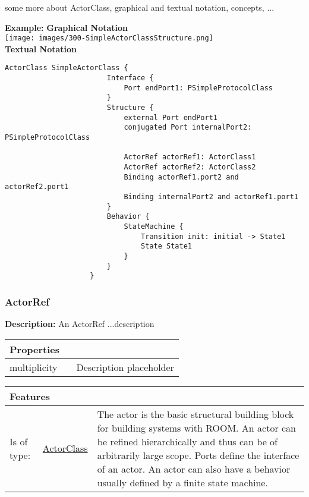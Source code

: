 			some more about ActorClass, graphical and textual notation, concepts, ...
			
			\textbf{Example:} 
				\textbf{Graphical Notation}
				\\
					\texttt{[image: images/300-SimpleActorClassStructure.png]}
				\\
				\textbf{Textual Notation}
				\\
					\begin{lstlisting}[language=ROOM]
					ActorClass SimpleActorClass {
						Interface {
							Port endPort1: PSimpleProtocolClass
						}
						Structure {
							external Port endPort1
							conjugated Port internalPort2: PSimpleProtocolClass
				
							ActorRef actorRef1: ActorClass1
							ActorRef actorRef2: ActorClass2
							Binding actorRef1.port2 and actorRef2.port1
							Binding internalPort2 and actorRef1.port1
						}
						Behavior {
							StateMachine {
								Transition init: initial -> State1
								State State1
							}
						}
					}
					\end{lstlisting}
		
		\vspace{\baselineskip}
		\vspace{\baselineskip}
		\vspace{\baselineskip}
		
		\subsubsection{\huge ActorRef}
			\hypertarget{ref:ActorRef}{}
			
			\textbf{Description:} An ActorRef ...description
			
			\begingroup
			\renewcommand{\arraystretch}{1.8} %
			\begin{longtable}{p{2.5cm}p{4cm} p{}}
				\multicolumn{2}{l}{\textbf{\large Properties}} \\
				\hline
			\tabitem multiplicity &  & Description placeholder\\
			\end{longtable}
			\endgroup
			
			\begingroup
			\renewcommand{\arraystretch}{1.8} %
			\begin{longtable}{p{2.5cm}|p{4cm} p{}}
				\multicolumn{2}{l}{\textbf{\large Features}} & \\
				\hline
			Is of type: & \tabitem \hyperlink{ref:ActorClass}{ActorClass}  & The actor is the basic structural building block for building systems with ROOM. An actor can be refined hierarchically and thus can be of arbitrarily large scope. Ports define the interface of an actor. An actor can also have a behavior usually defined by a finite state machine. \\
			\hline
			\end{longtable}
			\endgroup
			
